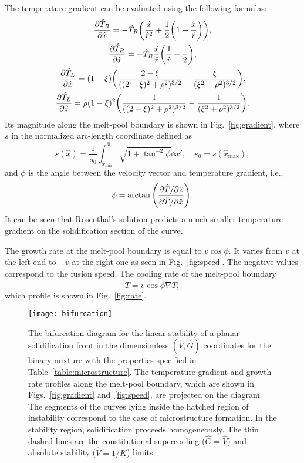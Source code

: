 \documentclass{article}
\begin{document}
The temperature gradient can be evaluated using the following formulas:
\begin{gather}
    \pdv{\hat{T}_R}{\hat{x}} =
        -\hat{T}_R\qty( \frac{\hat{x}}{\hat{r}^2} + \frac12\qty(1 + \frac{\hat{x}}{\hat{r}}) ), \label{eq:dTRdx}\\
    \pdv{\hat{T}_R}{\hat{x}} =
        -\hat{T}_R\frac{\hat{x}}{\hat{r}}\qty( \frac1{\hat{r}} + \frac12 ), \label{eq:dTRdz}\\
    \pdv{\hat{T}_L}{\hat{x}} =
        (1-\xi)\qty( \frac{2-\xi}{((2-\xi)^2 + \rho^2)^{3/2}} - \frac{\xi}{(\xi^2 + \rho^2)^{3/2}} ), \label{eq:dTLdx}\\
    \pdv{\hat{T}_L}{\hat{z}} =
        \rho(1-\xi)^2\qty( \frac1{((2-\xi)^2 + \rho^2)^{3/2}} - \frac1{(\xi^2 + \rho^2)^{3/2}} ). \label{eq:dTLdz}
\end{gather}
Its magnitude along the melt-pool boundary is shown in Fig.~\ref{fig:gradient},
where $s$ in the normalized arc-length coordinate defined as
\begin{equation}\label{eq:s}
    s(\hat{x}) = \frac1{s_0}\int_{\hat{x}_\text{min}}^{\hat{x}}\sqrt{1+\tan^{-2}\phi}\dd{x}',
        \quad s_0 = s(\hat{x}_\text{max}),
\end{equation}
and $\phi$ is the angle between the velocity vector and temperature gradient, i.e.,
\begin{equation}\label{eq:phi}
    \phi = \arctan\qty(\frac{\partial\hat{T}/\partial\hat{z}}{\partial\hat{T}/\partial\hat{x}}).
\end{equation}
It can be seen that Rosenthal's solution predicts a much smaller temperature gradient
on the solidification section of the curve.

The growth rate at the melt-pool boundary is equal to $v\cos\phi$.
It varies from $v$ at the left end to $-v$ at the right one as seen in Fig.~\ref{fig:speed}.
The negative values correspond to the fusion speed.
The cooling rate of the melt-pool boundary
\begin{equation}\label{eq:dotT}
    \dot{T} = v\cos\phi\nabla T,
\end{equation}
which profile is shown in Fig.~\ref{fig:rate}.

\begin{figure}
    \centering
    \texttt{[image: bifurcation]}
    \caption{
        The bifurcation diagram for the linear stability of a planar solidification front
        in the dimensionless $(\hat{V},\hat{G})$ coordinates for the binary mixture
        with the properties specified in Table~\ref{table:microstructure}.
        The temperature gradient and growth rate profiles along the melt-pool boundary,
        which are shown in Figs.~\ref{fig:gradient} and~\ref{fig:speed}, are projected on the diagram.
        The segments of the curves lying inside the hatched region of instability correspond to the case
        of microstructure formation. In the stability region, solidification proceeds homogeneously.
        The thin dashed lines are the constitutional supercooling ($\hat{G} = \hat{V}$)
        and absolute stability ($\hat{V} = 1/K$) limits.
    }\label{fig:bifurcation}
\end{figure}
\end{document}
